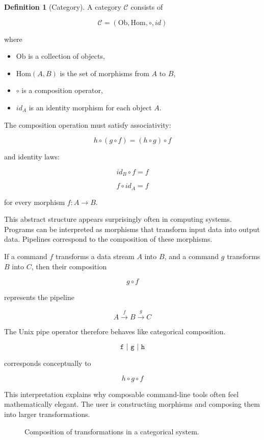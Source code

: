 \documentclass[11pt]{article}
\theoremstyle{definition}
\newtheorem{definition}{Definition}[section]
\begin{document}
\begin{definition}[Category]
A category $\mathcal{C}$ consists of

\[
\mathcal{C} = (\mathrm{Ob}, \mathrm{Hom}, \circ, id)
\]

where

\begin{itemize}
\item $\mathrm{Ob}$ is a collection of objects,
\item $\mathrm{Hom}(A,B)$ is the set of morphisms from $A$ to $B$,
\item $\circ$ is a composition operator,
\item $id_A$ is an identity morphism for each object $A$.
\end{itemize}

The composition operation must satisfy associativity:

\[
h \circ (g \circ f) = (h \circ g) \circ f
\]

and identity laws:

\[
id_B \circ f = f
\]

\[
f \circ id_A = f
\]

for every morphism $f : A \rightarrow B$.
\end{definition}

This abstract structure appears surprisingly often in computing
systems. Programs can be interpreted as morphisms that transform input
data into output data. Pipelines correspond to the composition of these
morphisms.

If a command $f$ transforms a data stream $A$ into $B$, and a command
$g$ transforms $B$ into $C$, then their composition

\[
g \circ f
\]

represents the pipeline

\[
A \xrightarrow{f} B \xrightarrow{g} C
\]

The Unix pipe operator therefore behaves like categorical composition.

\[
\texttt{f | g | h}
\]

corresponds conceptually to

\[
h \circ g \circ f
\]

This interpretation explains why composable command-line tools often
feel mathematically elegant. The user is constructing morphisms and
composing them into larger transformations.

\begin{figure}[h]
\centering
{}
\caption{Composition of transformations in a categorical system.}
\end{figure}
\end{document}
